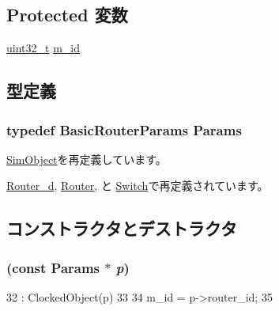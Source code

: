 \subsection*{Protected 変数}
\begin{DoxyCompactItemize}
\item 
\hyperlink{Type_8hh_a435d1572bf3f880d55459d9805097f62}{uint32\_\-t} \hyperlink{classBasicRouter_ac970dc89366c6c0cb38a2f944b3672b6}{m\_\-id}
\end{DoxyCompactItemize}


\subsection{型定義}
\hypertarget{classBasicRouter_af2c419269bc768b96a7bae9bfbcd3e94}{
\subsubsection[{Params}]{\setlength{\rightskip}{0pt plus 5cm}typedef BasicRouterParams {\bf Params}}}
\label{classBasicRouter_af2c419269bc768b96a7bae9bfbcd3e94}


\hyperlink{classSimObject_a0f0761d2db586a23bb2a2880b8f387bb}{SimObject}を再定義しています。

\hyperlink{classRouter__d_a0aa71fc14ebbcbd38c18c172bdbc48eb}{Router\_\-d}, \hyperlink{classRouter_aefbd30db7d0c203dbe4553fdfe3c2b0e}{Router}, と \hyperlink{classSwitch_a07c03790510d4a31198bb5deef53da38}{Switch}で再定義されています。

\subsection{コンストラクタとデストラクタ}
\hypertarget{classBasicRouter_a127b0f75e5bb61b1cc01126b9206abaf}{
\subsubsection[{BasicRouter}]{ (const {\bf Params} $\ast$ {\em p})}}
\label{classBasicRouter_a127b0f75e5bb61b1cc01126b9206abaf}



\begin{DoxyCode}
32     : ClockedObject(p)
33 {
34     m_id = p->router_id;
35 }
\end{DoxyCode}



